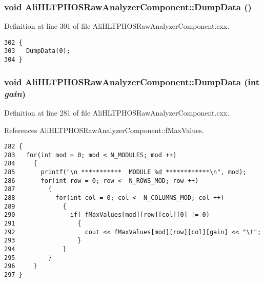 \subsubsection{\setlength{\rightskip}{0pt plus 5cm}void Ali\-HLTPHOSRaw\-Analyzer\-Component::Dump\-Data ()\hspace{0.3cm}{\tt  [inherited]}}\label{classAliHLTPHOSRawAnalyzerComponent_AliHLTPHOSRawAnalyzerPeakFinderComponenta8}




Definition at line 301 of file Ali\-HLTPHOSRaw\-Analyzer\-Component.cxx.

\footnotesize\begin{verbatim}302 {
303   DumpData(0);
304 }
\end{verbatim}\normalsize 


\subsubsection{\setlength{\rightskip}{0pt plus 5cm}void Ali\-HLTPHOSRaw\-Analyzer\-Component::Dump\-Data (int {\em gain})\hspace{0.3cm}{\tt  [inherited]}}\label{classAliHLTPHOSRawAnalyzerComponent_AliHLTPHOSRawAnalyzerPeakFinderComponenta7}




Definition at line 281 of file Ali\-HLTPHOSRaw\-Analyzer\-Component.cxx.

References Ali\-HLTPHOSRaw\-Analyzer\-Component::f\-Max\-Values.

\footnotesize\begin{verbatim}282 {
283   for(int mod = 0; mod < N_MODULES; mod ++)
284     {
285       printf("\n ***********  MODULE %d ************\n", mod);
286       for(int row = 0; row <  N_ROWS_MOD; row ++)
287         {
288           for(int col = 0; col <  N_COLUMNS_MOD; col ++)
289             {
290               if( fMaxValues[mod][row][col][0] != 0)
291                 { 
292                   cout << fMaxValues[mod][row][col][gain] << "\t";
293                 }
294             }
295         } 
296     }
297 }
\end{verbatim}\normalsize 


